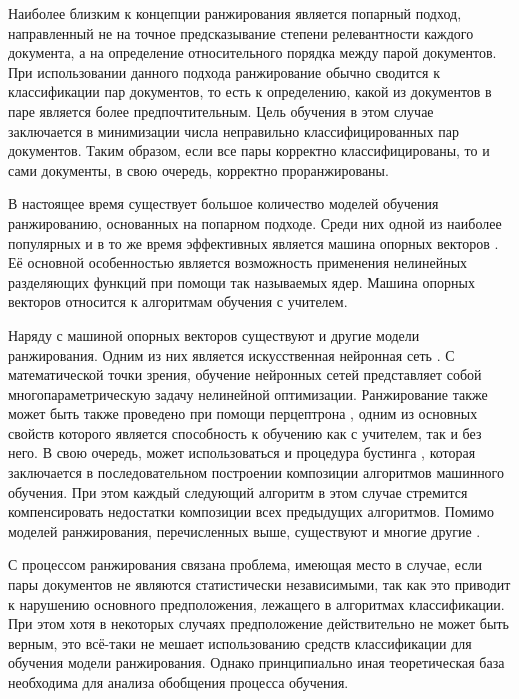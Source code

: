 \documentclass[12pt,a4paper,oneside]{article}
\begin{document}
\par
Наиболее близким к концепции ранжирования является попарный подход, направленный не на точное предсказывание степени релевантности каждого документа, а на определение относительного порядка между парой документов. 
При использовании данного подхода ранжирование обычно сводится к классификации пар документов, то есть к определению, какой из документов в паре является более предпочтительным.
Цель обучения в этом случае заключается в минимизации числа неправильно классифицированных пар документов. 
Таким образом, если все пары корректно классифицированы, то и сами документы, в свою очередь, корректно проранжированы. 

\par
В настоящее время существует большое количество моделей обучения ранжированию, основанных на попарном подходе. 
Среди них одной из наиболее популярных и в то же время эффективных является машина опорных векторов  . 
Её основной особенностью является возможность применения нелинейных разделяющих функций при помощи так называемых ядер. 
Машина опорных векторов относится к алгоритмам обучения с учителем. 

\par
Наряду с машиной опорных векторов существуют и другие модели ранжирования. 
Одним из них является искусственная нейронная сеть .  
С математической точки зрения, обучение нейронных сетей представляет собой многопараметрическую задачу нелинейной оптимизации. 
Ранжирование также может быть также проведено при помощи перцептрона  , одним из основных свойств которого является способность к обучению как с учителем, так и без него. 
В свою очередь, может использоваться и процедура бустинга , которая заключается в последовательном построении композиции алгоритмов машинного обучения. 
При этом каждый следующий алгоритм в этом случае стремится компенсировать недостатки композиции всех предыдущих алгоритмов. 
Помимо моделей ранжирования, перечисленных выше, существуют и многие другие    . 

\par
С процессом ранжирования связана проблема, имеющая место в случае, если пары документов не являются статистически независимыми, так как это приводит к нарушению основного предположения, лежащего в алгоритмах классификации. 
При этом хотя в некоторых случаях предположение действительно не может быть верным, это всё-таки не мешает использованию средств классификации для обучения модели ранжирования. 
Однако принципиально иная теоретическая база необходима для анализа обобщения процесса обучения. 
\end{document}
